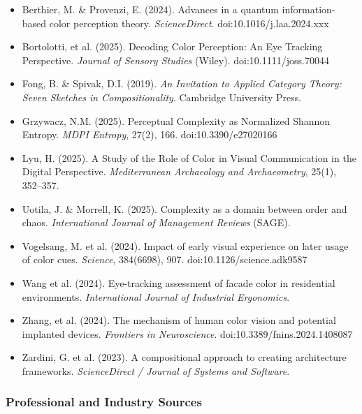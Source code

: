 \documentclass[11pt,letterpaper]{article}
\begin{document}
\begin{itemize}[leftmargin=2em, itemsep=0.2em, label={--}]
  \item Berthier, M. \& Provenzi, E. (2024). Advances in a quantum information-based color perception theory. \textit{ScienceDirect}. doi:10.1016/j.laa.2024.xxx
  \item Bortolotti, et al. (2025). Decoding Color Perception: An Eye Tracking Perspective. \textit{Journal of Sensory Studies} (Wiley). doi:10.1111/joss.70044
  \item Fong, B. \& Spivak, D.I. (2019). \textit{An Invitation to Applied Category Theory: Seven Sketches in Compositionality}. Cambridge University Press.
  \item Grzywacz, N.M. (2025). Perceptual Complexity as Normalized Shannon Entropy. \textit{MDPI Entropy}, 27(2), 166. doi:10.3390/e27020166
  \item Lyu, H. (2025). A Study of the Role of Color in Visual Communication in the Digital Perspective. \textit{Mediterranean Archaeology and Archaeometry}, 25(1), 352--357.
  \item Uotila, J. \& Morrell, K. (2025). Complexity as a domain between order and chaos. \textit{International Journal of Management Reviews} (SAGE).
  \item Vogelsang, M. et al. (2024). Impact of early visual experience on later usage of color cues. \textit{Science}, 384(6698), 907. doi:10.1126/science.adk9587
  \item Wang et al. (2024). Eye-tracking assessment of facade color in residential environments. \textit{International Journal of Industrial Ergonomics}.
  \item Zhang, et al. (2024). The mechanism of human color vision and potential implanted devices. \textit{Frontiers in Neuroscience}. doi:10.3389/fnins.2024.1408087
  \item Zardini, G. et al. (2023). A compositional approach to creating architecture frameworks. \textit{ScienceDirect / Journal of Systems and Software}.
\end{itemize}

\subsubsection{Professional and Industry Sources}
\end{document}
